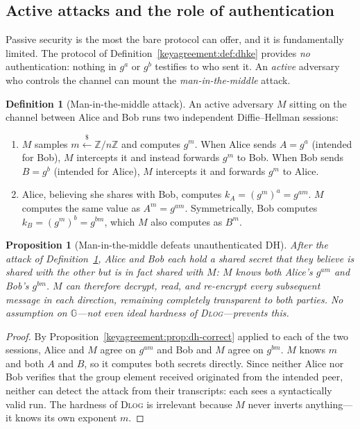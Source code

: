 \documentclass[11pt,a4paper]{article}
\newtheorem{proposition}[theorem]{Proposition}
\theoremstyle{definition}
\newtheorem{definition}[theorem]{Definition}
\theoremstyle{remark}
\newcommand{\Z}{\ensuremath{\mathbb{Z}}}
\newcommand{\G}{\ensuremath{\mathbb{G}}}
\begin{document}
\subsection{Active attacks and the role of authentication}\label{keyagreement:subsec:active}

Passive security is the most the bare protocol can offer, and it is fundamentally limited. The protocol of Definition~\ref{keyagreement:def:dhke} provides \emph{no} authentication: nothing in \(g^a\) or \(g^b\) testifies to who sent it. An \emph{active} adversary who controls the channel can mount the \emph{man-in-the-middle} attack.

\begin{definition}[Man-in-the-middle attack]\label{keyagreement:def:mitm}
An active adversary \(M\) sitting on the channel between Alice and Bob runs two independent Diffie--Hellman sessions:
\begin{enumerate}
  \item \(M\) samples \(m \xleftarrow{\$} \Z/n\Z\) and computes \(g^m\). When Alice sends \(A = g^a\) (intended for Bob), \(M\) intercepts it and instead forwards \(g^m\) to Bob. When Bob sends \(B = g^b\) (intended for Alice), \(M\) intercepts it and forwards \(g^m\) to Alice.
  \item Alice, believing she shares with Bob, computes \(k_{A} = (g^m)^a = g^{am}\). \(M\) computes the same value as \(A^m = g^{am}\). Symmetrically, Bob computes \(k_B = (g^m)^b = g^{bm}\), which \(M\) also computes as \(B^m\).
\end{enumerate}
\end{definition}

\begin{proposition}[Man-in-the-middle defeats unauthenticated DH]\label{keyagreement:prop:mitm}
After the attack of Definition~\ref{keyagreement:def:mitm}, Alice and Bob each hold a shared secret that they believe is shared with the other but is in fact shared with \(M\): \(M\) knows both Alice's \(g^{am}\) and Bob's \(g^{bm}\). \(M\) can therefore decrypt, read, and re-encrypt every subsequent message in each direction, remaining completely transparent to both parties. No assumption on \(\G\)---not even ideal hardness of \textsc{Dlog}---prevents this.
\end{proposition}

\begin{proof}
By Proposition~\ref{keyagreement:prop:dh-correct} applied to each of the two sessions, Alice and \(M\) agree on \(g^{am}\) and Bob and \(M\) agree on \(g^{bm}\). \(M\) knows \(m\) and both \(A\) and \(B\), so it computes both secrets directly. Since neither Alice nor Bob verifies that the group element received originated from the intended peer, neither can detect the attack from their transcripts: each sees a syntactically valid run. The hardness of \textsc{Dlog} is irrelevant because \(M\) never inverts anything---it knows its own exponent \(m\).
\end{proof}
\end{document}
